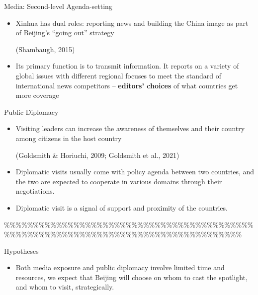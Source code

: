 \documentclass[
  ignorenonframetext,
]{beamer}
\begin{document}
\begin{frame}
\begin{frame}{Media: Second-level Agenda-setting}
\begin{itemize}
\item Xinhua has dual roles: reporting news and building the China
image as part of Beijing’s “going out” strategy \begin{footnotesize} (Shambaugh, 2015) \end{footnotesize}

\item Its primary function is to transmit information. It reports on a variety of global issues
with different regional focuses to meet the standard of international news competitors -- \textbf{editors' choices} of what countries get more coverage
\end{itemize}

\end{frame}

\begin{frame}{Public Diplomacy}


\begin{itemize}
\item Visiting leaders can increase the awareness of themselves and their country among
citizens in the host country \begin{footnotesize} (Goldsmith \& Horiuchi, 2009; Goldsmith et al., 2021) \end{footnotesize}

\item Diplomatic visits usually come with policy agenda between two countries,
and the two are expected to cooperate in various domains through their negotiations.

\item Diplomatic visit is a signal of support and proximity of
the countries.

\end{itemize}

\end{frame}

\%\%\%\%\%\%\%\%\%\%\%\%\%\%\%\%\%\%\%\%\%\%\%\%\%\%\%\%\%\%\%\%\%\%\%\%\%\%\%\%\%\%\%\%\%\%\%\%\%\%\%\%\%\%\%\%\%\%\%\%\%\%\%\%\%\%\%\%\%\%\%\%\%\%\%\%\%\%\%\%\%\%\%\%

\begin{frame}{Hypotheses}

\begin{itemize}

\item Both media exposure and public diplomacy involve limited time and resources,
we expect that Beijing will choose on whom to cast the spotlight, and whom to visit,
strategically. 


\end{itemize}
\end{frame}
\end{frame}
\end{document}

